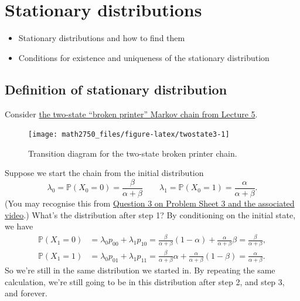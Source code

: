 \documentclass[
  a4paper,
]{article}
\providecommand{\tightlist}{%
  \setlength{\itemsep}{0pt}\setlength{\parskip}{0pt}}
\theoremstyle{definition}
\theoremstyle{definition}
\theoremstyle{definition}
\theoremstyle{remark}
\begin{document}
\hypertarget{S10-stationary-distributions}{%
\section{Stationary distributions}\label{S10-stationary-distributions}}

\begin{itemize}
\tightlist
\item
  Stationary distributions and how to find them
\item
  Conditions for existence and uniqueness of the stationary distribution
\end{itemize}

\hypertarget{def-stationary-definition}{%
\subsection{Definition of stationary distribution}\label{def-stationary-definition}}

Consider \protect\hyperlink{S05-example}{the two-state ``broken printer'' Markov chain from Lecture 5}.

\begin{figure}

{\centering \texttt{[image: math2750\_files/figure-latex/twostate3-1]} 

}

\caption{Transition diagram for the two-state broken printer chain.}\label{fig:twostate3}
\end{figure}

Suppose we start the chain from the initial distribution
\[ \lambda_0 = \mathbb P(X_0 = 0) = \frac{\beta}{\alpha+\beta} \qquad \lambda_1 = \mathbb P(X_0 = 1) = \frac{\alpha}{\alpha+\beta} . \]
(You may recognise this from \protect\hyperlink{P03}{Question 3 on Problem Sheet 3 and the associated video}.) What's the distribution after step 1? By conditioning on the initial state, we have
\begin{align*}
  \mathbb P(X_1 = 0) &= \lambda_0 p_{00} + \lambda_1 p_{10} = \frac{\beta}{\alpha+\beta}(1-\alpha) + \frac{\alpha}{\alpha+\beta}\beta = \frac{\beta}{\alpha+\beta} ,\\
  \mathbb P(X_1 = 1) &= \lambda_0 p_{01} + \lambda_1 p_{11} = \frac{\beta}{\alpha+\beta}\alpha + \frac{\alpha}{\alpha+\beta}(1-\beta) = \frac{\alpha}{\alpha+\beta} .
\end{align*}
So we're still in the same distribution we started in. By repeating the same calculation, we're still going to be in this distribution after step 2, and step 3, and forever.
\end{document}
